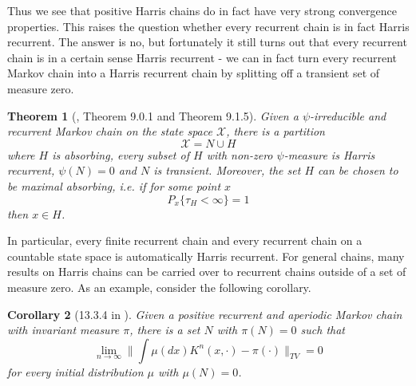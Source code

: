 \documentclass[a4paper, draft]{article}
\theoremstyle{own}
\newtheorem{thm}{Theorem}[section]
\newtheorem{cor}[thm]{Corollary}
\theoremstyle{remark}
\begin{document}
Thus we see that positive Harris chains do in fact have very strong convergence properties. This raises the question whether every recurrent chain is in fact Harris recurrent. The answer is no, but fortunately it still turns out that every recurrent chain is in a certain sense Harris recurrent  - we can in fact turn every recurrent Markov chain into a Harris recurrent chain by splitting off a transient set of measure zero. 

\begin{thm}[\cite{MeynTweedie}, Theorem 9.0.1 and Theorem 9.1.5]
	\label{thm:maximalharrisset}
	Given a $\psi$-irreducible and recurrent Markov chain on the state space ${\mathcal X}$, there is a partition
	$$
	{\mathcal X} = N \cup H
	$$
	where $H$ is absorbing, every subset of $H$ with non-zero $\psi$-measure is Harris recurrent, $\psi(N)=0$ and $N$ is transient. Moreover, the set $H$ can be chosen to be {\em maximal absorbing}, i.e. if for some point $x$
	$$
	P_x \{\tau_H < \infty \} = 1
	$$
	then $x \in H$. 
\end{thm}

In particular, every finite recurrent chain and every recurrent chain on a countable state space is automatically Harris recurrent. For general chains, many results on Harris chains can be carried over to recurrent chains outside of a set of measure zero. As an example, consider the following corollary. 

\begin{cor}[13.3.4 in \cite{MeynTweedie}]
	Given a positive recurrent and aperiodic Markov chain with invariant measure $\pi$, there is a set $N$ with $\pi(N) = 0$ such that 
	$$
	\lim_{n \rightarrow \infty} \| \int \mu(dx)K^n(x, \cdot) - \pi(\cdot) \|_{TV} = 0
	$$
	for every initial distribution $\mu$ with $\mu(N)=0$. 
\end{cor}
\end{document}
